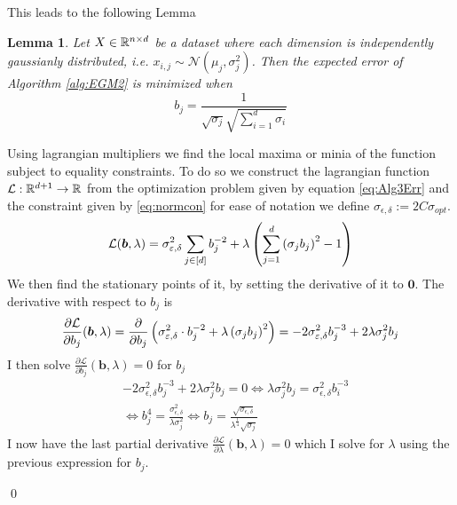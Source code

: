 \documentclass[a4paper,12pt]{article}
\renewenvironment{proof}{{\textit{Proof} \\}}{\qed}
\newtheorem{lemma}{Lemma}[section]
\begin{document}
\noindent This leads to the following Lemma

\begin{lemma}
\label{lem:Optb}
Let $X \in \mathbb{R}^{n \times d}$ be a dataset where each dimension is independently gaussianly distributed, i.e.
$x_{i,j} \sim \mathcal{N}(\mu_j, \sigma_j^2)$. Then the expected error of Algorithm \ref{alg:EGM2} is minimized when
\[
    b_j = \frac{1}{\sqrt{\sigma_j} \sqrt{\sum_{i=1}^d \sigma_i}}
\]
\end{lemma}
\begin{proof}
Using lagrangian multipliers we find the local maxima or 
minia of the function subject to equality constraints.
To do so we construct the lagrangian function $\mathcal{L}: \mathbb{R}^{d+1} \rightarrow \mathbb{R}$ from the optimization problem given by
equation \eqref{eq:Alg3Err} and the constraint given by \eqref{eq:normcon} for ease of notation we define 
$\sigma_{\epsilon, \delta} := 2C\sigma_{opt}$.
\[
    \mathcal{L}(\bm{b},\lambda) = \sigma_{\varepsilon,\delta}^2\sum_{j \in [d]} b_j^{-2}
    + \lambda \left ( \sum_{j=1}^d \left (\sigma_j b_j\right)^2 - 1\right)
\]
We then find the stationary points of it,
by setting the derivative of it to $\bm{0}$.
The derivative with respect to $b_j$ is 
\[
    \frac{\partial \mathcal{L}}{\partial b_j} (\bm{b}, \lambda)= 
    \frac{\partial}{\partial b_j} \left (\sigma_{\varepsilon,\delta}^2 \cdot b_j^{-2}
    + \lambda \left (\sigma_j b_j\right)^2\right) =
    -2 \sigma_{\varepsilon,\delta}^2 b_j^{-3} + 2 \lambda \sigma_j^2b_j
\]
I then solve $\frac{\partial \mathcal{L}}{\partial b_j}(\bm{b},\lambda) = 0$ for $b_j$
\begin{align}
    &-2\sigma_{\epsilon,\delta}^2 b_j^{-3} + 2 \lambda \sigma_j^2b_j = 0 \iff
    \lambda \sigma_j^2b_j = \sigma_{\epsilon,\delta}^2 b_i^{-3}  \\
\label{eq:solvbi}
    &\iff b_j^4 = \frac{\sigma_{\epsilon,\delta}^2}{\lambda \sigma_j^2} \iff 
    b_j = \frac{\sqrt{\sigma_{\epsilon,\delta}}}{\lambda^{\frac{1}{4}} \sqrt{\sigma_j}} 
\end{align}
I now have the last partial derivative 
$\frac{\partial \mathcal{L}}{\partial \lambda}(\bm{b},\lambda) = 0$ which I solve for
$\lambda$ using the previous expression for $b_j$.


\end{proof}
\end{document}
